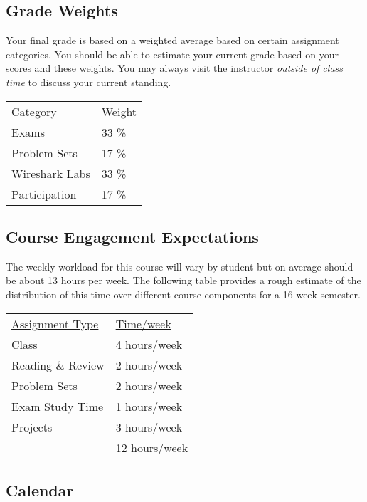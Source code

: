 \documentclass[10pt]{article}
\begin{document}
\subsection{Grade Weights}

Your final grade is based on a weighted average based on certain  assignment categories.  You should be able to estimate your current grade based on your scores and these weights.  You may always visit the instructor \textit{outside of class time} to discuss your current standing.

\begin{center}
  \begin{tabular}{ll}
  \underline{Category} & \underline{Weight} \\
    Exams & 33 \% \\ %
    Problem Sets &  17 \% \\ %
    Wireshark Labs & 33 \% \\ %
    Participation & 17 \%
  \end{tabular}
\end{center}


\subsection{Course Engagement Expectations}

The weekly workload for this course will vary by student but on average should be about 13 hours per week.  The following table provides a rough estimate of the distribution of this time over different course components for a 16 week semester.
\begin{center}
\begin{tabular}{ll}
\underline{Assignment Type}  & \underline{Time/week} \\
Class   & 4 hours/week \\
Reading \& Review  & 2 hours/week \\
Problem Sets & 2 hours/week \\
Exam Study Time & 1 hours/week \\
Projects  & 3 hours/week \\
\bottomrule
 & 12 hours/week
\end{tabular}
\end{center}


\subsection{Calendar}
\end{document}
